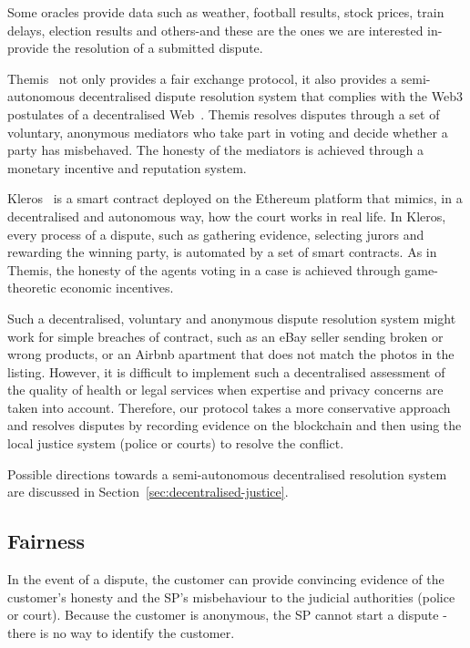 \documentclass[pdftex,twocolumn,epjc3]{svjour3}
\begin{document}
{Some oracles provide data such as weather, football results, stock prices, train delays, election results and others-and these are the ones we are interested in-provide the resolution of a submitted dispute.

Themis~\cite{mengThemisDecentralizedEscrow2019} not only provides a fair exchange protocol, it also provides a semi-autonomous decentralised dispute resolution system that complies with the Web3 postulates of a decentralised Web~\cite{ethereumWhatWeb3Why2023}. Themis resolves disputes through a set of voluntary, anonymous mediators who take part in voting and decide whether a party has misbehaved. The honesty of the mediators is achieved through a monetary incentive and reputation system.

Kleros~\cite{bergollaKlerosSociolegalCase2022} is a smart contract deployed on the Ethereum platform that mimics, in a decentralised and autonomous way, how the court works in real life. In Kleros, every process of a dispute, such as gathering evidence, selecting jurors and rewarding the winning party, is automated by a set of smart contracts. As in Themis, the honesty of the agents voting in a case is achieved through game-theoretic economic incentives.

Such a decentralised, voluntary and anonymous dispute resolution system might work for simple breaches of contract, such as an eBay seller sending broken or wrong products, or an Airbnb apartment that does not match the photos in the listing. However, it is difficult to implement such a decentralised assessment of the quality of health or legal services when expertise and privacy concerns are taken into account. Therefore, our protocol takes a more conservative approach and resolves disputes by recording evidence on the blockchain and then using the local justice system (police or courts) to resolve the conflict.

Possible directions towards a semi-autonomous decentralised resolution system are discussed in Section~\ref{sec:decentralised-justice}.

\subsection{Fairness}\label{fairness}

In the event of a dispute, the customer can provide convincing evidence of the customer's honesty and the SP's misbehaviour to the judicial authorities (police or court). 
Because the customer is anonymous, the SP cannot start a dispute - there is no way to identify the customer.

}
\end{document}
